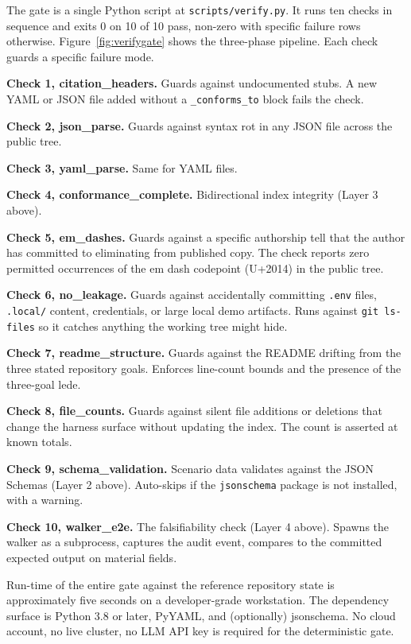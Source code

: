 \documentclass[twocolumn,10pt,a4paper]{article}
\begin{document}
The gate is a single Python script at \texttt{scripts/verify.py}. It runs ten checks in sequence and exits 0 on 10 of 10 pass, non-zero with specific failure rows otherwise. Figure~\ref{fig:verifygate} shows the three-phase pipeline. Each check guards a specific failure mode.

\textbf{Check 1, citation\_headers.} Guards against undocumented stubs. A new YAML or JSON file added without a \texttt{\_conforms\_to} block fails the check.

\textbf{Check 2, json\_parse.} Guards against syntax rot in any JSON file across the public tree.

\textbf{Check 3, yaml\_parse.} Same for YAML files.

\textbf{Check 4, conformance\_complete.} Bidirectional index integrity (Layer 3 above).

\textbf{Check 5, em\_dashes.} Guards against a specific authorship tell that the author has committed to eliminating from published copy. The check reports zero permitted occurrences of the em dash codepoint (U+2014) in the public tree.

\textbf{Check 6, no\_leakage.} Guards against accidentally committing \texttt{.env} files, \texttt{.local/} content, credentials, or large local demo artifacts. Runs against \texttt{git ls-files} so it catches anything the working tree might hide.

\textbf{Check 7, readme\_structure.} Guards against the README drifting from the three stated repository goals. Enforces line-count bounds and the presence of the three-goal lede.

\textbf{Check 8, file\_counts.} Guards against silent file additions or deletions that change the harness surface without updating the index. The count is asserted at known totals.

\textbf{Check 9, schema\_validation.} Scenario data validates against the JSON Schemas (Layer 2 above). Auto-skips if the \texttt{jsonschema} package is not installed, with a warning.

\textbf{Check 10, walker\_e2e.} The falsifiability check (Layer 4 above). Spawns the walker as a subprocess, captures the audit event, compares to the committed expected output on material fields.

Run-time of the entire gate against the reference repository state is approximately five seconds on a developer-grade workstation. The dependency surface is Python 3.8 or later, PyYAML, and (optionally) jsonschema. No cloud account, no live cluster, no LLM API key is required for the deterministic gate.
\end{document}
